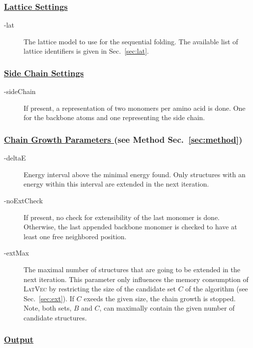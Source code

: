 \documentclass{article}
\newcommand{\latvec}{\textsc{LatVec}}
\begin{document}
\subsubsection*{\underline{ Lattice Settings }}

\begin{description}
	\item[-lat] The lattice model to use for the sequential folding. The
	available list of lattice identifiers is given in Sec.~\ref{sec:lat}.
\end{description}


\subsubsection*{\underline{ Side Chain Settings }}

\begin{description}
	\item[-sideChain] If present, a representation of two monomers per amino acid
	is done. One for the backbone atoms and one representing the side chain. 
\end{description}


\subsubsection*{\underline{ Chain Growth Parameters } (see Method
Sec.~\ref{sec:method})}

\begin{description}
	\item[-deltaE] Energy interval above the minimal energy found. Only structures
	with an energy within this interval are extended in the next iteration.
	\item[-noExtCheck] If present, no check for extensibility of the last monomer
	is done. Otherwise, the last appended backbone monomer is checked to have at
	least one free neighbored position.
	\item[-extMax] The maximal number of structures that are going to be extended
	in the next iteration. This parameter only influences the memory consumption
	of \latvec{} by restricting the size of the candidate set $C$ of the algorithm
	(see Sec.~\ref{sec:ext}). If $C$ exeeds the given size, the chain growth is
	stopped. Note, both sets, $B$ and $C$, can maximally contain the given number
	of candidate structures.
	\end{description}


\subsubsection*{\underline{ Output }}
\end{document}
